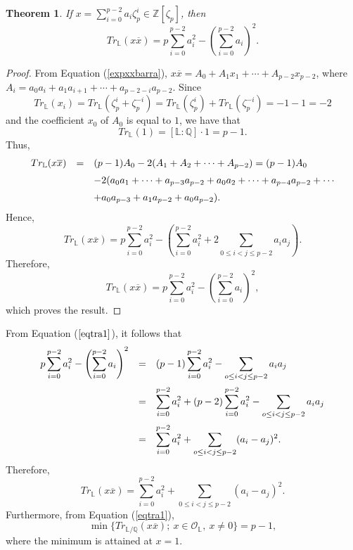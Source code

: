 \documentclass{amsart}
\newtheorem{theorem}{Theorem}
\begin{document}
\begin{theorem} \label{teo-2} If $x=\displaystyle\sum_{i=0}^{p-2}a_i\zeta_p^i\in\mathbb{Z}[\zeta_p]$, then \[ Tr_{\mathbb{L}}(x\overline{x})=\displaystyle p\sum_{i=0}^{p-2}a_i^2 - \left(\sum_{i=0}^{p-2}a_i\right)^2. \]\end{theorem} \begin{proof} %
From Equation (\ref{expxxbarra}), $x\overline{x}=A_0+A_1x_1+\cdots + A_{p-2}x_{p-2}$, where $A_i=a_0a_i+a_1a_{i+1}+\cdots +a_{p-2-i}a_{p-2}.$ Since
\[ Tr_{\mathbb{L}}(x_i)=Tr_{\mathbb{L}}(\zeta_p^i+\zeta_p^{-i}) = Tr_{\mathbb{L}}(\zeta_p^i)+Tr_{\mathbb{L}}(\zeta_p^{-i})=-1-1=-2\]
and the coefficient $x_0$ of $A_0$ is equal to $1$, we have that \[ Tr_{\mathbb{L}}(1)=[\mathbb{L}:\mathbb{Q}]\cdot 1 = p-1. \] Thus,
\[ \begin{array}{lll} Tr_{\mathbb{L}}(x\overline{x}) &=& (p-1)A_0-2(A_1+A_2+\cdots+A_{p-2}) =(p-1)A_0\vspace{.2cm}\\ && -2(a_0a_1+\cdots+a_{p-3}a_{p-2}+a_0a_2+\cdots +a_{p-4}a_{p-2}+\cdots\vspace{.2cm}\\
&& +a_0a_{p-3}+a_1a_{p-2}+a_0a_{p-2}).\end{array} \] Hence, \[ Tr_{\mathbb{L}}(x\overline{x})=p\displaystyle\sum_{i=0}^{p-2}a_i^2-\left(\displaystyle\sum_{i=0}^{p-2}a_i^2+2\displaystyle\sum_{0\leq
i< j\leq p-2}a_ia_j\right). \] Therefore, \begin{equation} \label{eqtra1} Tr_{\mathbb{L}}(x\overline{x})=p\displaystyle\sum_{i=0}^{p-2}a_i^2-\left(\displaystyle\sum_{i=0}^{p-2}a_i\right)^2,
\end{equation} which proves the result. \end{proof}

From Equation ($\ref{eqtra1}$), it follows that \[ \begin{array}{lll} \displaystyle p\sum_{i=0}^{p-2}a_i^2-\left(\sum_{i=0}^{p-2}a_i\right)^2 & = &
 \displaystyle (p-1)\sum_{i=0}^{p-2}a_i^2 - \displaystyle\sum_{o\leq i<j\leq p-2} a_ia_j \vspace{.2cm}\\ &=& \displaystyle\sum_{i=0}^{p-2}a_i^2
+(p-2)\sum_{i=0}^{p-2}a_i^2- \sum_{o\leq i<j\leq p-2}a_ia_j \vspace{.2cm} \\ &=&   \displaystyle \sum_{i=0}^{p-2}a_i^2 + \sum_{o\leq i<j\leq p-2}(a_i-a_j)^2. \end{array} \]
Therefore, \[ Tr_{\mathbb{L}}(x\overline{x})=\displaystyle\sum_{i=0}^{p-2}a_i^2+\displaystyle\sum_{0\leq i< j\leq p-2}(a_i-a_j)^2. \] Furthermore, from Equation (\ref{eqtra1}), \[ \min\{ Tr_{\mathbb{L}/\mathbb{Q}}(x\overline{x}); \  x \in \mathcal{O}_{\mathbb{L}}, \ x \neq 0\} = p-1, \] where the minimum is attained at $x=1$. %
\end{document}
